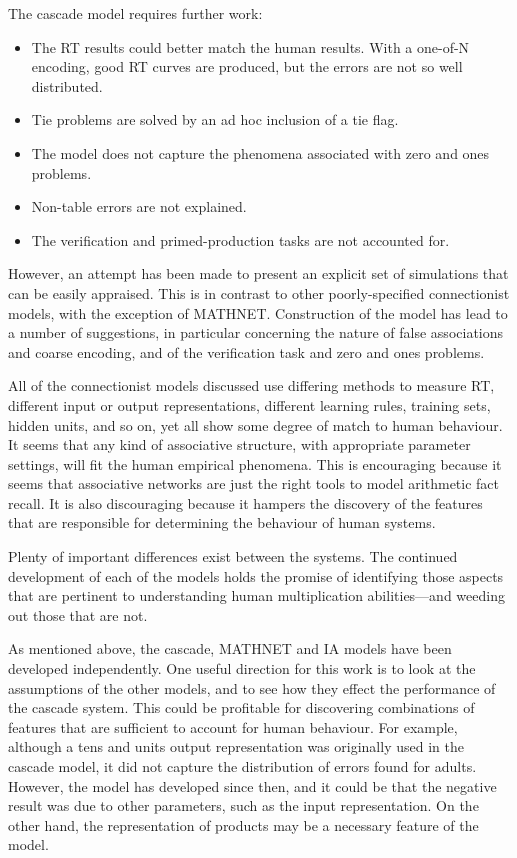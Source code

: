 The cascade model requires further work:
\begin{itemize}
\item The RT results could better match the human results.  With a one-of-N
encoding, good RT curves are produced, but the errors are not so well
distributed.
\item Tie problems are solved by an ad hoc inclusion of a tie flag.
\item The model does not capture the phenomena associated with zero
and ones problems.
\item Non-table errors are not explained.
\item The verification and primed-production tasks are not accounted for.
\end{itemize}

However, an attempt has been made to present an explicit set of simulations
that can be easily appraised.  This is in contrast to other poorly-specified
connectionist models, with the exception of MATHNET\@.  Construction of the
model has lead to a number of suggestions, in particular concerning the
nature of false associations and coarse encoding, and of the verification
task and zero and ones problems.

All of the connectionist models discussed use differing methods to measure
RT, different input or output representations, different learning rules,
training sets, hidden units, and so on, yet all show some degree of match
to human behaviour.  It seems that any kind of associative structure, with
appropriate parameter settings, will fit the human empirical phenomena.
This is encouraging because it seems that associative networks are just the
right tools to model arithmetic fact recall.  It is also discouraging
because it hampers the discovery of the features that are responsible for
determining the behaviour of human systems.

Plenty of important differences exist between the systems. The
continued development of each of the models holds the promise of
identifying those aspects that are pertinent to understanding human
multiplication abilities---and weeding out those that are not.

As mentioned above, the cascade, MATHNET and IA models have been
developed independently. One useful direction for this work is to look at
the assumptions of the other models, and to see how they effect the
performance of the cascade system.  This could be profitable for
discovering combinations of features that are sufficient to account for
human behaviour. For example, although a tens and units
output representation was originally used in the cascade model, it did not
capture the distribution of errors found for adults.  However, the model
has developed since then, and it could be that the negative result was due
to other parameters, such as the input representation.  On the other hand,
the representation of products may be a necessary feature of the model.

